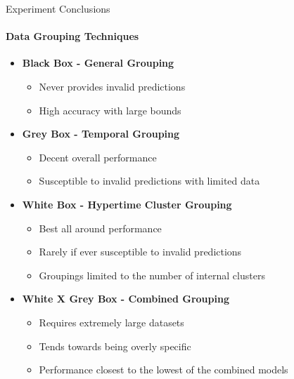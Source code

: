 \documentclass{beamer}
\begin{document}
\begin{frame}[t]{Experiment Conclusions}
  \framesubtitle{Data Grouping Techniques}
  \vspace*{-.25cm}
  \setlength\itemsep{1.25em}

  \begin{itemize}
    \item \textbf{Black Box - General Grouping}
      \begin{itemize}
        \item Never provides invalid predictions
        \item High accuracy with large bounds
      \end{itemize}

    \item \textbf{Grey Box - Temporal Grouping}
      \begin{itemize}
        \item Decent overall performance
        \item Susceptible to invalid predictions with limited data
      \end{itemize}

    \item \textbf{White Box - Hypertime Cluster Grouping}
      \begin{itemize}
        \item Best all around performance
        \item Rarely if ever susceptible to invalid predictions
        \item Groupings limited to the number of internal clusters
      \end{itemize}

    \item \textbf{White X Grey Box - Combined Grouping}
      \begin{itemize}
        \item Requires extremely large datasets
        \item Tends towards being overly specific
        \item Performance closest to the lowest of the combined models
      \end{itemize}

  \end{itemize}
\end{frame}
\end{document}
